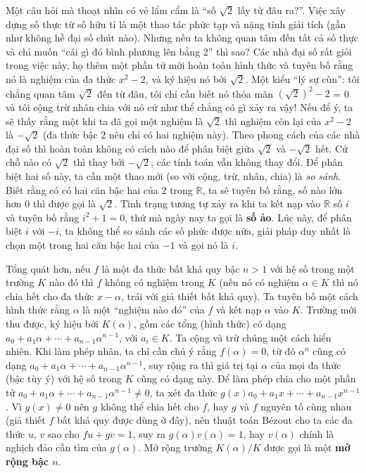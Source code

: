\documentclass[12pt]{article}
\begin{document}
Một câu hỏi mà thoạt nhìn có vẻ lẩm cẩm là ``số $\sqrt{2}$ lấy từ đâu ra?''. Việc xây dựng số thực từ số hữu tỉ là một thao tác phức tạp và nặng tính giải tích (gần như không hề đại số chút nào). Nhưng nếu ta không quan tâm đến tất cả số thực và chỉ muốn ``cái gì đó bình phương lên bằng 2'' thì sao? Các nhà đại số rất giỏi trong việc này, họ thêm một phần tử mới hoàn toàn hình thức và tuyên bố rằng nó là nghiệm của đa thức $x^2 - 2$, và ký hiệu nó bởi $\sqrt{2}$. Một kiểu ``lý sự cùn'': tôi chẳng quan tâm $\sqrt{2}$ đến từ đâu, tôi chỉ cần biết nó thỏa mãn $(\sqrt{2})^2 - 2$ = 0 và tôi cộng trừ nhân chia với nó cứ như thể chẳng có gì xảy ra vậy! Nếu để ý, ta sẽ thấy rằng một khi ta đã gọi một nghiệm là $\sqrt{2}$ thì nghiệm còn lại của $x^2 - 2$ là $-\sqrt{2}$ (đa thức bậc $2$ nên chỉ có hai nghiệm này). Theo phong cách của các nhà đại số thì hoàn toàn không có cách nào để phân biệt giữa $\sqrt{2}$ và $-\sqrt{2}$ hết. Cứ chỗ nào có $\sqrt{2}$ thì thay bởi $-\sqrt{2}$, các tính toán vẫn không thay đổi. Để phân biệt hai số này, ta cần một thao mới (so với cộng, trừ, nhân, chia) là {\it so sánh}. Biết rằng có có hai căn bậc hai của $2$ trong $\mathbb{R}$, ta sẽ tuyên bố rằng, số nào lớn hơn $0$ thì được gọi là $\sqrt{2}$. Tình trạng tương tự xảy ra khi ta kết nạp vào $\mathbb{R}$ số $i$ và tuyên bố rằng $i^2 + 1 = 0$, thứ mà ngày nay ta gọi là {\bf số ảo}. Lúc này, để phân biệt $i$ với $-i$, ta không thể so sánh các số phức được nữa, giải pháp duy nhất là chọn một trong hai căn bậc hai của $-1$ và gọi nó là $i$.

Tổng quát hơn, nếu $f$ là một đa thức bất khả quy bậc $n > 1$ với hệ số trong một trường $K$ nào đó thì $f$ không có nghiệm trong $K$ (nếu nó có nghiệm $\alpha \in K$ thì nó chia hết cho đa thức $x - \alpha$, trái với giả thiết bất khả quy). Ta tuyên bố một cách hình thức rằng $\alpha$ là một ``nghiệm nào đó'' của $f$ và kết nạp $\alpha$ vào $K$. Trường mới thu được, ký hiệu bởi $K(\alpha)$, gồm các tổng (hình thức) có dạng $a_0+a_1\alpha+\cdots+a_{n-1}\alpha^{n-1}$, với $a_i \in K$. Ta cộng và trừ chúng một cách hiển nhiên. Khi làm phép nhân, ta chỉ cần chú ý rằng $f(\alpha) = 0$, từ đó $\alpha^n$ cũng có dạng $a_0+a_1\alpha+\cdots+a_{n-1}\alpha^{n-1}$, suy rộng ra thì giá trị tại $\alpha$ của mọi đa thức (bậc tùy ý) với hệ số trong $K$ cũng có dạng này. Để làm phép chia cho một phần tử $a_0+a_1\alpha+\cdots+a_{n-1}\alpha^{n-1} \neq 0$, ta xét đa thức $g(x) a_0+a_1x+\cdots+a_{n-1}x^{n-1}$. Vì $g(x) \neq 0$ nên $g$ không thể chia hết cho $f$, hay $g$ và $f$ nguyên tố cùng nhau (giả thiết $f$ bất khả quy được dùng ở đây), nên thuật toán Bézout cho ta các đa thức $u$, $v$ sao cho $fu+gv=1$, suy ra $g(\alpha)v(\alpha) = 1$, hay $v(\alpha)$ chính là nghịch đảo cần tìm của $g(\alpha)$. Mở rộng trường $K(\alpha)/K$ được gọi là một {\bf mở rộng bậc $n$}.
\end{document}
